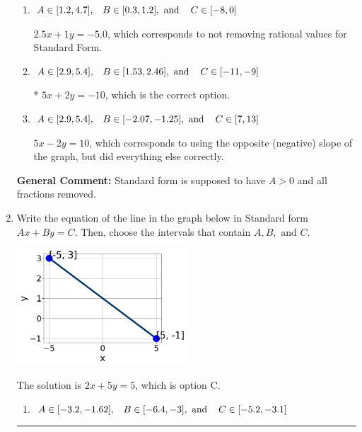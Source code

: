 \documentclass{extbook}[14pt]
\newcommand{\litem}[1]{\item #1

\rule{\textwidth}{0.4pt}}
\begin{document}
\begin{enumerate}
{\begin{enumerate}[label=\Alph*.]
 $-5x - 2y = 10$, which corresponds to not making $A$ positive (by multiplying the equation by $-1$).
\item \( A \in [1.2, 4.7], \hspace{3mm} B \in [0.3, 1.2], \text{ and } \hspace{3mm} C \in [-8, 0] \)

 $2.5x + 1y = -5.0$, which corresponds to not removing rational values for Standard Form.
\item \( A \in [2.9, 5.4], \hspace{3mm} B \in [1.53, 2.46], \text{ and } \hspace{3mm} C \in [-11, -9] \)

* $5x + 2y = -10$, which is the correct option.
\item \( A \in [2.9, 5.4], \hspace{3mm} B \in [-2.07, -1.25], \text{ and } \hspace{3mm} C \in [7, 13] \)

 $5x - 2y = 10$, which corresponds to using the opposite (negative) slope of the graph, but did everything else correctly.
\end{enumerate}

\textbf{General Comment:} Standard form is supposed to have $A > 0$ and all fractions removed.
}
\litem{
Write the equation of the line in the graph below in Standard form $Ax+By=C$. Then, choose the intervals that contain $A, B, \text{ and } C$.

\begin{center}
    \includegraphics[width=0.5\textwidth]{../Figures/linearGraphToStandardC.png}
\end{center}




The solution is \( 2x + 5y = 5 \), which is option C.\begin{enumerate}[label=\Alph*.]
\item \( A \in [-3.2, -1.62], \hspace{3mm} B \in [-6.4, -3], \text{ and } \hspace{3mm} C \in [-5.2, -3.1] \)


\end{enumerate}}
\end{enumerate}
\end{document}

